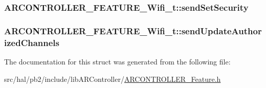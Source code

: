 \subsubsection[{\texorpdfstring{send\+Set\+Security}{sendSetSecurity}}]{ A\+R\+C\+O\+N\+T\+R\+O\+L\+L\+E\+R\+\_\+\+F\+E\+A\+T\+U\+R\+E\+\_\+\+Wifi\+\_\+t\+::send\+Set\+Security}\hypertarget{struct_a_r_c_o_n_t_r_o_l_l_e_r___f_e_a_t_u_r_e___wifi__t_a8c4bd99bff0b6e696ec41c55637fc2ab}{}\label{struct_a_r_c_o_n_t_r_o_l_l_e_r___f_e_a_t_u_r_e___wifi__t_a8c4bd99bff0b6e696ec41c55637fc2ab}
\subsubsection[{\texorpdfstring{send\+Update\+Authorized\+Channels}{sendUpdateAuthorizedChannels}}]{ A\+R\+C\+O\+N\+T\+R\+O\+L\+L\+E\+R\+\_\+\+F\+E\+A\+T\+U\+R\+E\+\_\+\+Wifi\+\_\+t\+::send\+Update\+Authorized\+Channels}\hypertarget{struct_a_r_c_o_n_t_r_o_l_l_e_r___f_e_a_t_u_r_e___wifi__t_a16f3c3e9136ba97169631bdba2f10732}{}\label{struct_a_r_c_o_n_t_r_o_l_l_e_r___f_e_a_t_u_r_e___wifi__t_a16f3c3e9136ba97169631bdba2f10732}


The documentation for this struct was generated from the following file\+:\begin{DoxyCompactItemize}
\item 
src/hal/pb2/include/lib\+A\+R\+Controller/\hyperlink{_a_r_c_o_n_t_r_o_l_l_e_r___feature_8h}{A\+R\+C\+O\+N\+T\+R\+O\+L\+L\+E\+R\+\_\+\+Feature.\+h}\end{DoxyCompactItemize}
